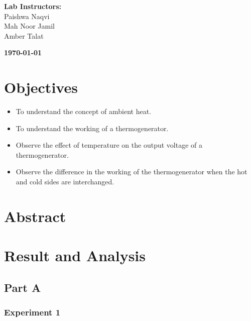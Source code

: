 \documentclass[a4paper, 12pt, english]{article}
\begin{document}
\begin{titlepage}
\begin{center}
		\vspace{45pt}
		\textbf {\large Lab Instructors:}\\[0.2cm]
		\Large {Paishwa Naqvi}\\[0.1cm]
		\Large {Mah Noor Jamil}\\[0.1cm]
		\Large {Amber Talat}\\[0.1cm]
	\end{center}

	\par
	\vfill
	\begin{center}
		\textbf{\today}\\
	\end{center}

\end{titlepage}



\newpage
\section{Objectives}
\begin{itemize}
	\item To understand the concept of ambient heat.
	\item To understand the working of a thermogenerator.
	\item Observe the effect of temperature on the output voltage of a thermogenerator.
	\item Observe the difference in the working of the thermogenerator when the hot and
	      cold sides are interchanged.
\end{itemize}

\section{Abstract}

\section{Result and Analysis}
\subsection{Part A}
\subsubsection{Experiment 1}
\end{document}
